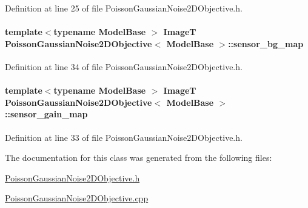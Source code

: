 Definition at line 25 of file Poisson\+Gaussian\+Noise2\+D\+Objective.\+h.

\paragraph[{\texorpdfstring{sensor\+\_\+bg\+\_\+map}{sensor_bg_map}}]{\setlength{\rightskip}{0pt plus 5cm}template$<$typename Model\+Base $>$ ImageT {\bf Poisson\+Gaussian\+Noise2\+D\+Objective}$<$ Model\+Base $>$\+::sensor\+\_\+bg\+\_\+map}\hypertarget{classPoissonGaussianNoise2DObjective_a84c763dc1db0d927cc1f8bcecdb3b663}{}\label{classPoissonGaussianNoise2DObjective_a84c763dc1db0d927cc1f8bcecdb3b663}


Definition at line 34 of file Poisson\+Gaussian\+Noise2\+D\+Objective.\+h.

\paragraph[{\texorpdfstring{sensor\+\_\+gain\+\_\+map}{sensor_gain_map}}]{\setlength{\rightskip}{0pt plus 5cm}template$<$typename Model\+Base $>$ ImageT {\bf Poisson\+Gaussian\+Noise2\+D\+Objective}$<$ Model\+Base $>$\+::sensor\+\_\+gain\+\_\+map}\hypertarget{classPoissonGaussianNoise2DObjective_aa28337c212470a6a5a152e691bcb7d45}{}\label{classPoissonGaussianNoise2DObjective_aa28337c212470a6a5a152e691bcb7d45}


Definition at line 33 of file Poisson\+Gaussian\+Noise2\+D\+Objective.\+h.



The documentation for this class was generated from the following files\+:\begin{DoxyCompactItemize}
\item 
\hyperlink{PoissonGaussianNoise2DObjective_8h}{Poisson\+Gaussian\+Noise2\+D\+Objective.\+h}\item 
\hyperlink{PoissonGaussianNoise2DObjective_8cpp}{Poisson\+Gaussian\+Noise2\+D\+Objective.\+cpp}\end{DoxyCompactItemize}
